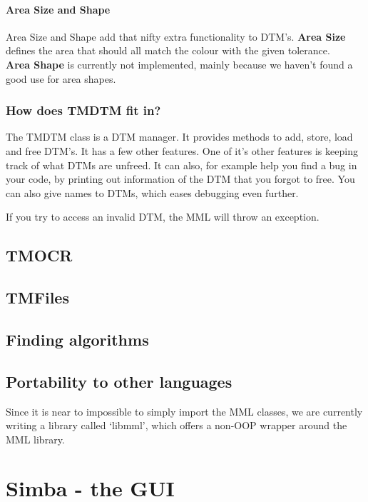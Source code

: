 \documentclass[a4paper, 10pt]{report} %
\begin{document}
\subsubsection{Area Size and Shape}

Area Size and Shape add that nifty extra functionality to DTM's.
\textbf{Area Size} defines the area that should all match the colour
with the given tolerance. \\
\textbf{Area Shape} is currently not implemented, mainly because
we haven't found a good use for area shapes.

\subsection{How does TMDTM fit in?}

The TMDTM class is a DTM manager. It provides methods to add, store, load
and free DTM's. It has a few other features. One of it's other features
is keeping track of what DTMs are unfreed. It can also, for example help you
find a bug in your code, by printing out information of the DTM that you forgot to free.
You can also give names to DTMs, which eases debugging even further.

If you try to access an invalid DTM, the MML will throw an exception.

\section{TMOCR}

\section{TMFiles}

\section{Finding algorithms}

\section{Portability to other languages}

Since it is near to impossible to simply import the MML classes, we are
currently writing a library called `libmml', which offers a non-OOP wrapper
around the MML library.


\chapter{Simba - the GUI}
\end{document}
